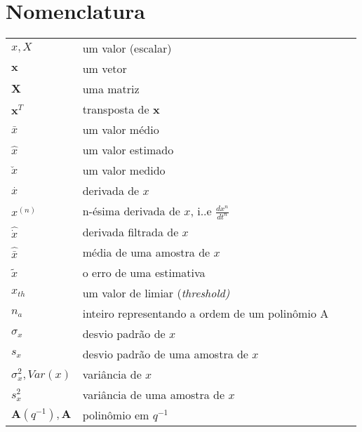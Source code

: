 \section{Nomenclatura}

\begin{tabular}{llll}
$x,X$ 						& um valor (escalar) 			 			\\ 
$\mathbf{x}$ 					& um vetor 				 			\\ 
$\mathbf{X}$ 					& uma matriz 							\\
$\mathbf{x}^{T}$ 				& transposta de $\mathbf{x}$ 				\\
$\bar{x}$ 						& um valor médio 						\\ 
$\hat{x}$ 						& um valor estimado 					\\ 
$\breve{x}$ 					& um valor medido 						\\
$\stackrel{.}{x}$ 				& derivada de $x$ 						\\  
$x^{(n)}$ 						& n-ésima derivada de $x$, i..e $\frac{dx^n}{dt^n}$		\\  
$\widehat{\dot{x}}$ 				& derivada filtrada de $x$ 					\\ 
$\widehat{\bar{x}}$ 				& média de uma amostra de $x$ 			\\
$\tilde{x}$ 						& o erro de uma estimativa				\\
$x_{th}$ 						& um valor de limiar (\it{threshold})			\\
$n_a$ 						& inteiro representando a ordem de um polinômio A				\\
$\sigma _{x}$					& desvio padrão de $x$ 					\\ 
$ s_x$						& desvio padrão de uma amostra de $x$ 		\\ 
$\sigma _{x}^{2}, Var(x)$ 			& variância de $x$ 						\\ 
${s}_{x}^{2}$ 					& variância de uma amostra de $x$ 			\\ 
$\mathbf{A}(q^{-1}), \mathbf{A}$ 	& polinômio em $q^{-1}$									\\

\end{tabular}
